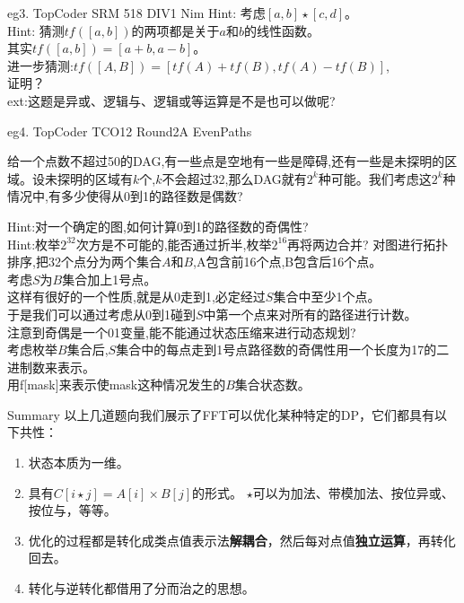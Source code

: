 \documentclass[allowframebreaks,10pt]{beamer}
\begin{document}
\begin{frame}{eg3. TopCoder SRM 518 DIV1 Nim}
Hint: 考虑$[a,b] \star [c,d]$。\\
Hint: 猜测$tf([a,b])$的两项都是关于$a$和$b$的线性函数。\\
\pause
其实$tf([a,b])=[a+b,a-b]$。\\
\pause
进一步猜测:$tf([A,B])=[tf(A)+tf(B),tf(A)-tf(B)]$, \\ 
证明？\\
\pause
ext:这题是异或、逻辑与、逻辑或等运算是不是也可以做呢?
\end{frame}

\begin{frame}{eg4. TopCoder TCO12 Round2A EvenPaths}
\begin{example}
给一个点数不超过50的DAG,有一些点是空地有一些是障碍,还有一些是未探明的区域。设未探明的区域有$k$个,$k$不会超过32,那么DAG就有$2^k$种可能。我们考虑这$2^k$种情况中,有多少使得从0到1的路径数是偶数?
\end{example}
\pause
Hint:对一个确定的图,如何计算0到1的路径数的奇偶性? \\
\pause
Hint:枚举$2^{32}$次方是不可能的,能否通过折半,枚举$2^{16}$再将两边合并?
\pause
对图进行拓扑排序,把32个点分为两个集合$A$和$B$,A包含前16个点,B包含后16个点。\\
考虑$S$为$B$集合加上1号点。\\
这样有很好的一个性质,就是从0走到1,必定经过$S$集合中至少1个点。\\
于是我们可以通过考虑从0到1碰到$S$中第一个点来对所有的路径进行计数。\\
\pause
注意到奇偶是一个01变量,能不能通过状态压缩来进行动态规划?\\
考虑枚举$B$集合后,$S$集合中的每点走到1号点路径数的奇偶性用一个长度为17的二进制数来表示。\\
\pause
用f[mask]来表示使mask这种情况发生的$B$集合状态数。\\
\end{frame}

\begin{frame}{Summary}
以上几道题向我们展示了FFT可以优化某种特定的DP，它们都具有以下共性：
\pause
\begin{enumerate}
\item 状态本质为一维。 
\pause
\item 具有$C[i \star j] = A[i] \times B[j]$的形式。
$\star$可以为加法、带模加法、按位异或、按位与，等等。
\pause
\item 优化的过程都是转化成类点值表示法\textbf{解耦合}，然后每对点值\textbf{独立运算}，再转化回去。
\pause
\item 转化与逆转化都借用了分而治之的思想。
\end{enumerate}
\end{frame}
\end{document}
